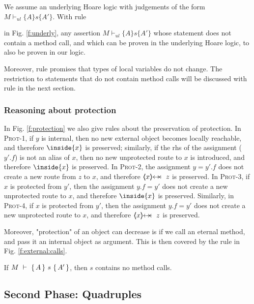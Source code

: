 We assume  an underlying Hoare logic with judgements of the form $M \vdash_{ul} \{ A \} s \{ A' \}$.
With rule {{} in Fig. \ref{f:underly},  any assertion $M \vdash_{ul} \{ A \} s \{ A' \}$  whose statement does not contain a method call, and which 
can be proven in the underlying Hoare logic, to also be proven in our logic.


Moreover, rule {} promises that types of local variables do not change. The restriction to statements that do not contain method calls will be discussed with rule {} in the next section.

 

 \subsubsection{Reasoning about protection}

{
In Fig. \ref{f:protection} we also give rules about the preservation of protection.
In \textsc{Prot-1}, if $y$ is internal, then no new external object becomes locally reachable, and therefore $ \inside{x}$ is preserved;
similarly, if the rhs of the assignment ($y'.f$) is not an alias of $x$, then no new unprotected route to $x$ is introduced, and therefore  $ \inside{x}$ is preserved.
In \textsc{Prot-2}, the assignment $y=y'.f$ does not create a new route from $z$ to $x$, and therefore  $\protectedFrom{x}{z}$ is preserved.
In \textsc{Prot-3}, if $x$ is protected from $y'$, then the assignment $y.f=y'$ does not create a new unprotected route   to $x$, and therefore  $\inside {x}$ is preserved.
Similarly, in \textsc{Prot-4}, if $x$ is protected from $y'$, then the assignment $y.f=y'$ does not create a new unprotected route  to $x$, and therefore   $\protectedFrom{x}{z}$ is preserved.
}

Moreover, "protection" of an object can decrease is if we call an eternal method, and pass it an internal object as argument. This is then covered by the rule in Fig. \ref{f:external:calls}.

\begin{lemma}
\label{l:no:meth:calls}
If ${M\ \vdash\ \{\,A\, \} \ s\  \{\,A'\, \} }$, then $s$ contains no method calls.
\end{lemma}

\subsection{Second Phase: Quadruples}

}
